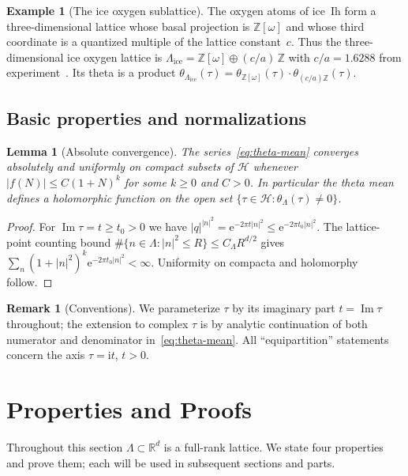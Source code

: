 \documentclass[11pt,letterpaper]{article}
\theoremstyle{plain}
\newtheorem{lemma}[theorem]{Lemma}
\theoremstyle{definition}
\newtheorem{example}[theorem]{Example}
\newtheorem{remark}[theorem]{Remark}
\newcommand{\Eisenstein}{\mathbb{Z}[\omega]}
\newcommand{\R}{\mathbb{R}}
\newcommand{\Z}{\mathbb{Z}}
\newcommand{\Lat}{\Lambda}
\newcommand{\e}{\mathrm{e}}
\DeclareMathOperator{\Imag}{Im}
\begin{document}
\begin{example}[The ice oxygen sublattice]\label{ex:ice-O}
The oxygen atoms of ice~Ih form a three-dimensional lattice whose
basal projection is $\Eisenstein$ and whose third coordinate is a
quantized multiple of the lattice constant~$c$.  Thus the
three-dimensional ice oxygen lattice is
$\Lat_{\text{ice}} = \Eisenstein \oplus (c/a)\,\Z$ with
$c/a = 1.6288$ from experiment~\cite{PetrenkoWhitworth}.  Its theta
is a product
$\theta_{\Lat_{\text{ice}}}(\tau)
  = \theta_{\Eisenstein}(\tau)\cdot\theta_{(c/a)\Z}(\tau)$.
\end{example}

\subsection{Basic properties and normalizations}

\begin{lemma}[Absolute convergence]\label{lem:convergence}
The series~\eqref{eq:theta-mean} converges absolutely and
uniformly on compact subsets of $\mathcal{H}$ whenever
$|f(N)|\le C(1+N)^{k}$ for some $k\ge 0$ and $C>0$.  In particular
the theta mean defines a holomorphic function on the open set
$\{\tau\in\mathcal{H}:\theta_\Lat(\tau)\ne 0\}$.
\end{lemma}
\begin{proof}
For $\Imag\tau = t \ge t_0 > 0$ we have
$|q|^{|n|^2}=\e^{-2\pi t|n|^2}\le \e^{-2\pi t_0|n|^2}$.
The lattice-point counting bound
$\#\{n\in\Lat:|n|^2\le R\}\le C_\Lat R^{d/2}$ gives
$\sum_n (1+|n|^2)^k \e^{-2\pi t_0|n|^2}<\infty$.
Uniformity on compacta and holomorphy follow.
\end{proof}

\begin{remark}[Conventions]
We parameterize $\tau$ by its imaginary part $t=\Imag\tau$ throughout;
the extension to complex $\tau$ is by analytic continuation of both
numerator and denominator in~\eqref{eq:theta-mean}.  All
``equipartition'' statements concern the axis $\tau = \mathrm{i} t$,
$t>0$.
\end{remark}

\section{Properties and Proofs}\label{sec:properties}

Throughout this section $\Lat\subset\R^d$ is a full-rank lattice.
We state four properties and prove them; each will be used in
subsequent sections and parts.
\end{document}
